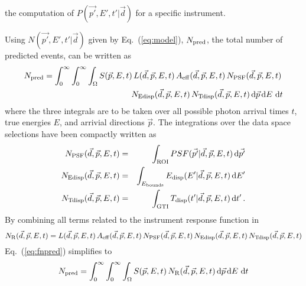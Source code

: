 \documentclass{article}[12pt,a4]
\begin{document}
the computation of
$P(\vec{p'}, E', t' | \vec{d})$ for a specific instrument.

Using $N(\vec{p'}, E', t' | \vec{d})$ given by Eq.~(\ref{eq:model}), $N_{\rm pred}$, the
total number of predicted events, can be written as
\begin{eqnarray}
N_{\rm pred} = \int_{0}^{\infty} \int_{0}^{\infty} \int_{\Omega} 
  S(\vec{p}, E, t) \,
  L(\vec{d}, \vec{p}, E, t) \,
  A_{\rm eff}(\vec{d}, \vec{p}, E, t) \,
  N_{\rm PSF}(\vec{d}, \vec{p}, E, t) \, \nonumber \\
  N_{\rm Edisp}(\vec{d}, \vec{p}, E, t) \,
  N_{\rm Tdisp}(\vec{d}, \vec{p}, E, t) 
\, {\rm d}\vec{p} \, {\rm d}E \, \,{\rm d}t
\label{eq:fnpred}
\end{eqnarray}
where the three integrals are to be taken over all possible photon arrival times $t$, 
true energies $E$, and arrivial directions $\vec{p}$.
The integrations over the data space selections have been compactly written
as
\begin{eqnarray}
N_{\rm PSF}(\vec{d}, \vec{p}, E, t) & = & 
\int_{\rm ROI} PSF(\vec{p'} | \vec{d}, \vec{p}, E, t) \, {\rm d}\vec{p'} \\
N_{\rm Edisp}(\vec{d}, \vec{p}, E, t) & = & 
\int_{E_{\rm bounds}} E_{\rm disp}(E' | \vec{d}, \vec{p}, E, t) \, {\rm d}E' \\
N_{\rm Tdisp}(\vec{d}, \vec{p}, E, t) & = & 
\int_{\rm GTI} T_{\rm disp}(t' | \vec{d}, \vec{p}, E, t) \, {\rm d}t' \, .
\end{eqnarray}
By combining all terms related to the instrument response function in
\begin{equation}
N_{\rm R}(\vec{d}, \vec{p}, E, t) = 
  L(\vec{d}, \vec{p}, E, t) \,
  A_{\rm eff}(\vec{d}, \vec{p}, E, t) \,
  N_{\rm PSF}(\vec{d}, \vec{p}, E, t) \,
  N_{\rm Edisp}(\vec{d}, \vec{p}, E, t) \,
  N_{\rm Tdisp}(\vec{d}, \vec{p}, E, t)
\label{eq:nirf}
\end{equation}
Eq.~(\ref{eq:fnpred}) simplifies to
\begin{equation}
N_{\rm pred} = \int_{0}^{\infty} \int_{0}^{\infty} \int_{\Omega} 
  S(\vec{p}, E, t) \,
  N_{\rm R}(\vec{d}, \vec{p}, E, t)
\, {\rm d}\vec{p} \, {\rm d}E \, \,{\rm d}t
\end{equation}


\end{document}
